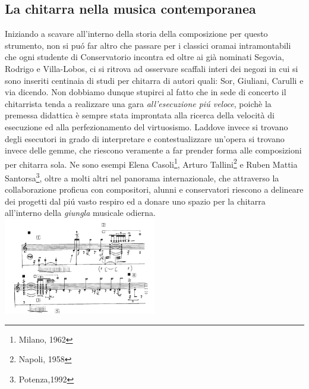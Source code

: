 \documentclass[oneside]{article}
\begin{document}
\begin{multicols*}{2}

\section{ La chitarra nella musica contemporanea}

Iniziando a scavare all'interno della storia della composizione per questo strumento, non si puó far altro che passare per i classici oramai intramontabili che ogni studente di Conservatorio incontra ed oltre ai già nominati Segovia, Rodrigo e Villa-Lobos, ci si ritrova ad osservare scaffali interi dei negozi in cui si sono inseriti centinaia di studi per chitarra di autori quali: Sor, Giuliani, Carulli e via dicendo. Non dobbiamo dunque stupirci al fatto che in sede di concerto il chitarrista tenda a realizzare una gara \textit{all'esecuzione piú veloce}, poichè la premessa didattica è sempre stata improntata alla ricerca della velocità di esecuzione ed alla perfezionamento del virtuosismo. Laddove invece si trovano degli esecutori in grado di interpretare e contestualizzare un'opera si trovano invece delle gemme, che riescono veramente a far prender forma alle composizioni per chitarra sola. Ne sono esempi Elena Casoli\footnote{Milano, 1962}, Arturo Tallini\footnote{Napoli, 1958} e Ruben Mattia Santorsa\footnote{Potenza,1992}, oltre a molti altri nel panorama internazionale, che attraverso la collaborazione proficua con compositori, alunni e conservatori riescono a delineare dei progetti dal piú vasto respiro ed a donare uno spazio per la chitarra all'interno della \textit{giungla} musicale odierna.
\includegraphics[width=0.5\textwidth]{img/ektopos.png}

\end{multicols*}
\end{document}
